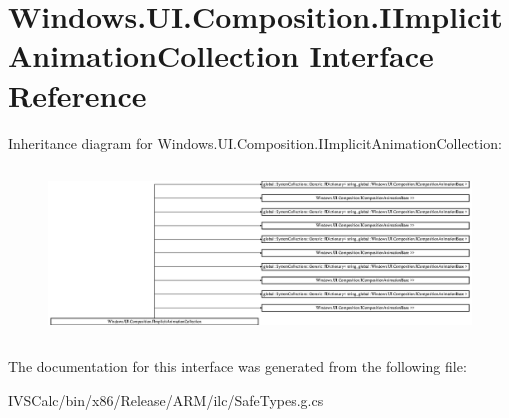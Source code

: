 \hypertarget{interface_windows_1_1_u_i_1_1_composition_1_1_i_implicit_animation_collection}{}\section{Windows.\+U\+I.\+Composition.\+I\+Implicit\+Animation\+Collection Interface Reference}
\label{interface_windows_1_1_u_i_1_1_composition_1_1_i_implicit_animation_collection}
Inheritance diagram for Windows.\+U\+I.\+Composition.\+I\+Implicit\+Animation\+Collection\+:\begin{figure}[H]
\begin{center}
\leavevmode
\includegraphics[height=4.536082cm]{interface_windows_1_1_u_i_1_1_composition_1_1_i_implicit_animation_collection}
\end{center}
\end{figure}


The documentation for this interface was generated from the following file\+:\begin{DoxyCompactItemize}
\item 
I\+V\+S\+Calc/bin/x86/\+Release/\+A\+R\+M/ilc/Safe\+Types.\+g.\+cs\end{DoxyCompactItemize}
